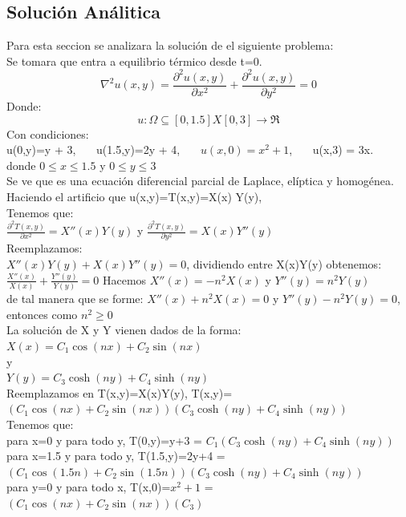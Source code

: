 \documentclass[11pt,a4paper]{article}
\begin{document}
\subsection{Solución Análitica}
\thispagestyle{empty}
Para esta seccion se analizara la solución de el siguiente problema:\\
Se tomara que entra a equilibrio térmico desde t=0.\\
$$
\nabla^2 u(x,y)=\frac{\partial^2 u(x,y)}{\partial x^2} + \frac{\partial^2 u(x,y)}{\partial y^2} = 0
$$
Donde: $$ u:\Omega \subseteq \left[0,1.5\right]X\left[0,3\right] \rightarrow \Re$$
Con condiciones:\\
u(0,y)=y + 3,~~~  u(1.5,y)=2y + 4,~~~  $u(x,0) = x^2 + 1 $,~~~  u(x,3) = 3x.\\
donde $ 0 \le x \le 1.5 $ y $ 0 \le y \le 3 $\\
Se ve que es una ecuación diferencial parcial de Laplace, elíptica y homogénea.\\
Haciendo el artificio que u(x,y)=T(x,y)=X(x) Y(y),\\ 
Tenemos que:\\
$\frac{\partial^2 T(x,y)}{\partial x^2} = X''(x)Y(y)$ y $\frac{\partial^2 T(x,y)}{\partial y^2} = X(x)Y''(y)$\\
Reemplazamos:\\
$ X''(x)Y(y) + X(x)Y''(y) = 0$, dividiendo entre X(x)Y(y) obtenemos:\\
$ \frac{X''(x)}{X(x)} + \frac{Y''(y)}{Y(y)} = 0$
Hacemos $ X''(x) = - n^2 X(x) $ y $ Y''(y) =  n^2 Y(y) $\\
de tal manera que se forme:
$ X''(x) + n^2 X(x) =0$ y $ Y''(y) -  n^2 Y(y)=0 $, entonces como $n^2 \ge 0 $\\
La solución de X y Y vienen dados de la forma:\\
$ X(x) = C_1 \cos(nx)+C_2 \sin(nx)  $ \\
y\\
$ Y(y) = C_3 \cosh(ny)+C_4 \sinh(ny) $ \\
Reemplazamos en T(x,y)=X(x)Y(y), T(x,y)=$\left( C_1 \cos(nx)+C_2 \sin(nx)\right) \left(C_3 \cosh(ny)+C_4 \sinh(ny)\right) $\\
Tenemos que:\\
para x=0 y para todo y, T(0,y)=y+3 = $C_1\left( C_3 \cosh(ny)+C_4 \sinh(ny)\right) $\\
para x=1.5 y para todo y, T(1.5,y)=2y+4 = $\left( C_1 \cos(1.5n)+C_2 \sin(1.5n)\right) \left( C_3 \cosh(ny)+C_4 \sinh(ny)\right) $\\
para y=0 y para todo x, T(x,0)=$x^2 + 1 $ = $\left( C_1 \cos(nx)+C_2 \sin(nx)\right)( C_3)  $\\
\end{document}
